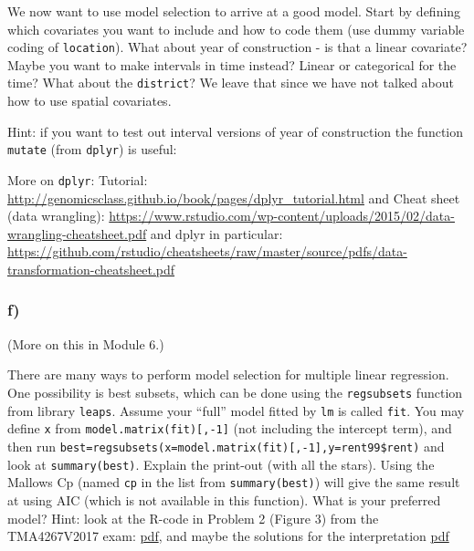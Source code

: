 \documentclass[]{article}
\newenvironment{Shaded}{\begin{snugshade}}{\end{snugshade}}
\newcommand{\KeywordTok}[1]{\textcolor[rgb]{0.13,0.29,0.53}{\textbf{#1}}}
\newcommand{\DataTypeTok}[1]{\textcolor[rgb]{0.13,0.29,0.53}{#1}}
\newcommand{\DecValTok}[1]{\textcolor[rgb]{0.00,0.00,0.81}{#1}}
\newcommand{\StringTok}[1]{\textcolor[rgb]{0.31,0.60,0.02}{#1}}
\newcommand{\OtherTok}[1]{\textcolor[rgb]{0.56,0.35,0.01}{#1}}
\newcommand{\OperatorTok}[1]{\textcolor[rgb]{0.81,0.36,0.00}{\textbf{#1}}}
\newcommand{\NormalTok}[1]{#1}
\begin{document}
We now want to use model selection to arrive at a good model. Start by
defining which covariates you want to include and how to code them (use
dummy variable coding of \texttt{location}). What about year of
construction - is that a linear covariate? Maybe you want to make
intervals in time instead? Linear or categorical for the time? What
about the \texttt{district}? We leave that since we have not talked
about how to use spatial covariates.

Hint: if you want to test out interval versions of year of construction
the function \texttt{mutate} (from \texttt{dplyr}) is useful:

\begin{Shaded}
\end{Shaded}

More on \texttt{dplyr}: Tutorial:
\url{http://genomicsclass.github.io/book/pages/dplyr_tutorial.html} and
Cheat sheet (data wrangling):
\url{https://www.rstudio.com/wp-content/uploads/2015/02/data-wrangling-cheatsheet.pdf}
and dplyr in particular:
\url{https://github.com/rstudio/cheatsheets/raw/master/source/pdfs/data-transformation-cheatsheet.pdf}

\subsubsection{f)}\label{f-1}

(More on this in Module 6.)

There are many ways to perform model selection for multiple linear
regression. One possibility is best subsets, which can be done using the
\texttt{regsubsets} function from library \texttt{leaps}. Assume your
``full'' model fitted by \texttt{lm} is called \texttt{fit}. You may
define \texttt{x} from \texttt{model.matrix(fit){[},-1{]}} (not
including the intercept term), and then run
\texttt{best=regsubsets(x=model.matrix(fit){[},-1{]},y=rent99\$rent)}
and look at \texttt{summary(best)}. Explain the print-out (with all the
stars). Using the Mallows Cp (named \texttt{cp} in the list from
\texttt{summary(best)}) will give the same result at using AIC (which is
not available in this function). What is your preferred model? Hint:
look at the R-code in Problem 2 (Figure 3) from the TMA4267V2017 exam:
\href{https://www.math.ntnu.no/emner/TMA4267/2017v/Exam/eV2017Enew.pdf}{pdf},
and maybe the solutions for the interpretation
\href{https://www.math.ntnu.no/emner/TMA4267/2017v/Exam/mergedLFV2017.pdf}{pdf}
\end{document}
